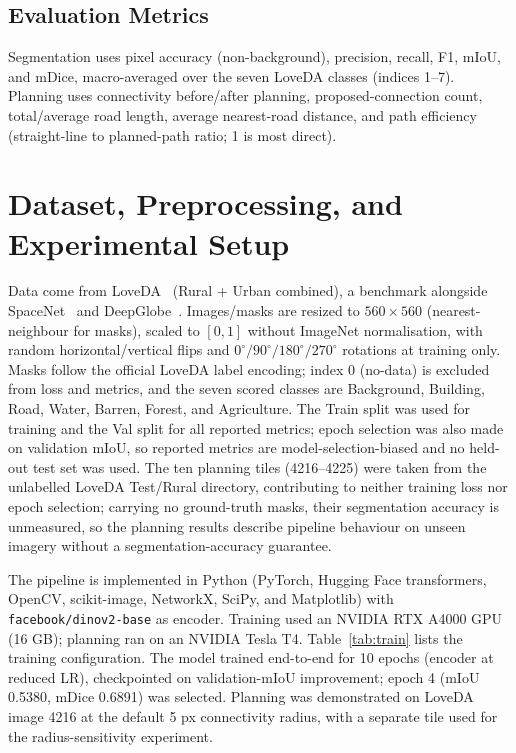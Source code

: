 \subsection{Evaluation Metrics}
Segmentation uses pixel accuracy (non-background), precision, recall, F1, mIoU, and mDice, macro-averaged over the seven LoveDA classes (indices 1--7). Planning uses connectivity before/after planning, proposed-connection count, total/average road length, average nearest-road distance, and path efficiency (straight-line to planned-path ratio; 1 is most direct).

\section{Dataset, Preprocessing, and Experimental Setup}\label{sec:setup}
Data come from LoveDA~\cite{wang2021loveda} (Rural + Urban combined), a benchmark alongside SpaceNet~\cite{vanetten2018} and DeepGlobe~\cite{demir2018}. Images/masks are resized to $560\times560$ (nearest-neighbour for masks), scaled to $[0,1]$ without ImageNet normalisation, with random horizontal/vertical flips and $0^\circ/90^\circ/180^\circ/270^\circ$ rotations at training only. Masks follow the official LoveDA label encoding; index 0 (no-data) is excluded from loss and metrics, and the seven scored classes are Background, Building, Road, Water, Barren, Forest, and Agriculture. The Train split was used for training and the Val split for all reported metrics; epoch selection was also made on validation mIoU, so reported metrics are model-selection-biased and no held-out test set was used. The ten planning tiles (4216--4225) were taken from the unlabelled LoveDA Test/Rural directory, contributing to neither training loss nor epoch selection; carrying no ground-truth masks, their segmentation accuracy is unmeasured, so the planning results describe pipeline behaviour on unseen imagery without a segmentation-accuracy guarantee.

The pipeline is implemented in Python (PyTorch, Hugging Face transformers, OpenCV, scikit-image, NetworkX, SciPy, and Matplotlib) with \texttt{facebook/dinov2-base} as encoder. Training used an NVIDIA RTX A4000 GPU (16 GB); planning ran on an NVIDIA Tesla T4. Table~\ref{tab:train} lists the training configuration. The model trained end-to-end for 10 epochs (encoder at reduced LR), checkpointed on validation-mIoU improvement; epoch 4 (mIoU 0.5380, mDice 0.6891) was selected. Planning was demonstrated on LoveDA image 4216 at the default 5 px connectivity radius, with a separate tile used for the radius-sensitivity experiment.

